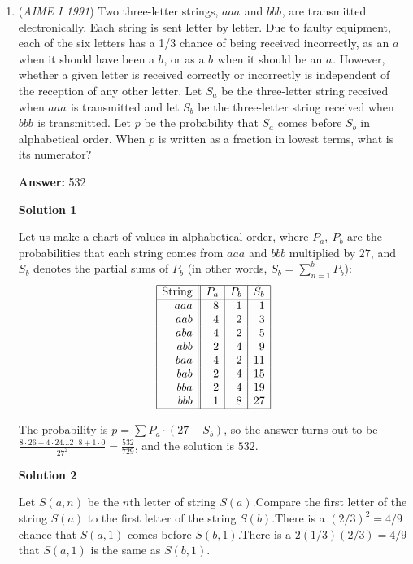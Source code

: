 \begin{enumerate}
	\item (\textit{AIME I 1991}) Two three-letter strings, $aaa^{}_{}$ and $bbb^{}_{}$, are transmitted electronically. Each string is sent letter by letter. Due to faulty equipment, each of the six letters has a 1/3 chance of being received incorrectly, as an $a^{}_{}$ when it should have been a $b^{}_{}$, or as a $b^{}_{}$ when it should be an $a^{}_{}$. However, whether a given letter is received correctly or incorrectly is independent of the reception of any other letter. Let $S_a^{}$ be the three-letter string received when $aaa^{}_{}$ is transmitted and let $S_b^{}$ be the three-letter string received when $bbb^{}_{}$ is transmitted. Let $p$ be the probability that $S_a^{}$ comes before $S_b^{}$ in alphabetical order. When $p$ is written as a fraction in lowest terms, what is its numerator?


 
 \textbf{Answer: }532



\textbf{Solution 1}

Let us make a chart of values in alphabetical order, where $P_a,\ P_b$ are the probabilities that each string comes from $aaa$ and $bbb$ multiplied by $27$, and $S_b$ denotes the partial sums of $P_b$ (in other words, $S_b = \sum_{n=1}^{b} P_b$):
 \[\begin{array}{|r||r|r|r|} \hline \text{String}&P_a&P_b&S_b\\ \hline aaa & 8 & 1 & 1 \\ aab & 4 & 2 & 3 \\ aba & 4 & 2 & 5 \\ abb & 2 & 4 & 9 \\ baa & 4 & 2 & 11 \\ bab & 2 & 4 & 15 \\ bba & 2 & 4 & 19 \\ bbb & 1 & 8 & 27 \\ \hline \end{array}\]

 The probability is $p=\sum P_a \cdot (27 - S_b)$, so the answer turns out to be $\frac{8\cdot 26 + 4 \cdot 24 \ldots 2 \cdot 8 + 1 \cdot 0}{27^2} = \frac{532}{729}$, and the solution is $\boxed{532}$.

 



\textbf{Solution 2}

Let $S(a,n)$ be the $n$th letter of string $S(a)$.Compare the first letter of the string $S(a)$ to the first letter of the string $S(b)$.There is a $(2/3)^2=4/9$ chance that $S(a,1)$ comes before $S(b,1)$.There is a $2(1/3)(2/3)=4/9$ that $S(a,1)$ is the same as $S(b,1)$.


\end{enumerate}

